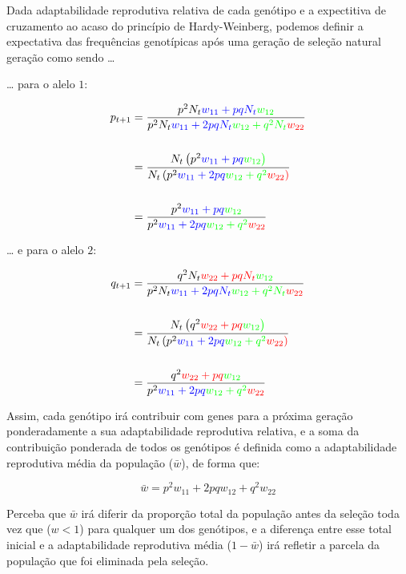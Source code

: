 \documentclass[
]{book}
\begin{document}
Dada adaptabilidade reprodutiva relativa de cada genótipo e a expectitiva de cruzamento ao acaso do princípio de Hardy-Weinberg, podemos definir a expectativa das frequências genotípicas após uma geração de seleção natural geração como sendo \ldots{}

\ldots{} para o alelo \(1\):

\[ 
\begin{aligned}
p_{t+1} 
&= \frac{p^2 N_t \color{blue}{w_{11}} + pq N_t \color{green}{w_{12}}}{p^2 N_t \color{blue}{w_{11}} + 2pq N_t \color{green}{w_{12}} + q^2 N_t \color{red}{w_{22}}} \\
\\
&= \frac{N_t \left( p^2 \color{blue}{w_{11}} + pq \color{green}{w_{12}} \right)}{N_t \left( p^2 \color{blue}{w_{11}} + 2pq \color{green}{w_{12}} + q^2 \color{red}{w_{22}}\right)} \\
\\
&= \frac{p^2 \color{blue}{w_{11}} + pq \color{green}{w_{12}}}{p^2 \color{blue}{w_{11}} + 2pq \color{green}{w_{12}} + q^2 \color{red}{w_{22}}}
\end{aligned}
\]

\ldots{} e para o alelo \(2\):

\[ 
\begin{aligned}
q_{t+1} 
&= \frac{q^2 N_t \color{red}{w_{22}} + pq N_t \color{green}{w_{12}}}{p^2 N_t \color{blue}{w_{11}} + 2pq N_t \color{green}{w_{12}} + q^2 N_t \color{red}{w_{22}}} \\
\\
&= \frac{N_t \left( q^2 \color{red}{w_{22}} + pq \color{green}{w_{12}} \right)}{N_t \left( p^2 \color{blue}{w_{11}} + 2pq \color{green}{w_{12}} + q^2 \color{red}{w_{22}}\right)} \\
\\
&= \frac{q^2 \color{red}{w_{22}} + pq \color{green}{w_{12}}}{p^2 \color{blue}{w_{11}} + 2pq \color{green}{w_{12}} + q^2 \color{red}{w_{22}}}
\end{aligned}
\]

Assim, cada genótipo irá contribuir com genes para a próxima geração ponderadamente a sua adaptabilidade reprodutiva relativa, e a soma da contribuição ponderada de todos os genótipos é definida como a adaptabilidade reprodutiva média
da população (\(\bar{w}\)), de forma que:

\[\bar{w} = p^2 w_{11} + 2pq w_{12} +  q^2 w_{22}\]

Perceba que \(\bar{w}\) irá diferir da proporção total da população antes da seleção toda vez que (\(w<1\)) para qualquer um dos genótipos, e a diferença entre esse total inicial e a adaptabilidade reprodutiva média (\(1 - \bar{w}\)) irá refletir a parcela da população que foi eliminada pela seleção.
\end{document}
